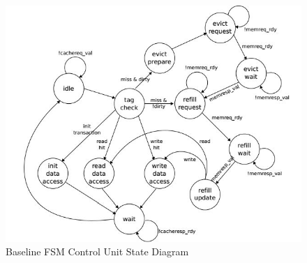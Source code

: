 \documentclass[10pt]{article}
\begin{document}



\pagebreak[4]




\begin{figure}[b]
\centering
\includegraphics[scale=0.8]{baselinestate}
\caption{Baseline FSM Control Unit State Diagram}
\label{fig:baselinestate}
\end{figure}
\end{document}
